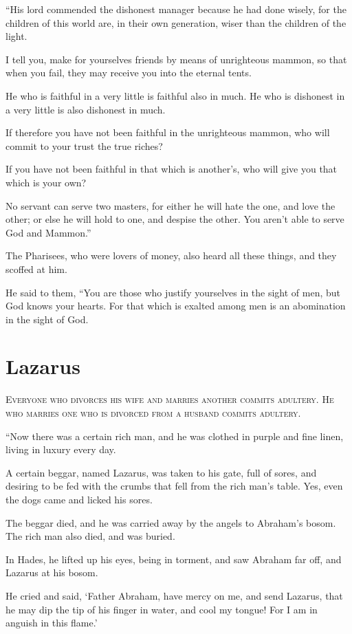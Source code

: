 “His lord commended the dishonest manager because he had done wisely, for the children of this world are, in their own generation, wiser than the children of the light.

I tell you, make for yourselves friends by means of unrighteous mammon, so that when you fail, they may receive you into the eternal tents.

He who is faithful in a very little is faithful also in much. He who is dishonest in a very little is also dishonest in much.

If therefore you have not been faithful in the unrighteous mammon, who will commit to your trust the true riches?

If you have not been faithful in that which is another’s, who will give you that which is your own?

No servant can serve two masters, for either he will hate the one, and love the other; or else he will hold to one, and despise the other. You aren’t able to serve God and Mammon.”

The Pharisees, who were lovers of money, also heard all these things, and they scoffed at him.

He said to them, “You are those who justify yourselves in the sight of men, but God knows your hearts. For that which is exalted among men is an abomination in the sight of God.


\clearpage \section*{Lazarus}

\lettrine{E}{veryone who divorces his wife and marries another commits adultery. He who marries one who is divorced from a husband commits adultery.}

“Now there was a certain rich man, and he was clothed in purple and fine linen, living in luxury every day.

A certain beggar, named Lazarus, was taken to his gate, full of sores, and desiring to be fed with the crumbs that fell from the rich man’s table. Yes, even the dogs came and licked his sores.

The beggar died, and he was carried away by the angels to Abraham’s bosom. The rich man also died, and was buried.

In Hades, he lifted up his eyes, being in torment, and saw Abraham far off, and Lazarus at his bosom.

He cried and said, ‘Father Abraham, have mercy on me, and send Lazarus, that he may dip the tip of his finger in water, and cool my tongue! For I am in anguish in this flame.’

